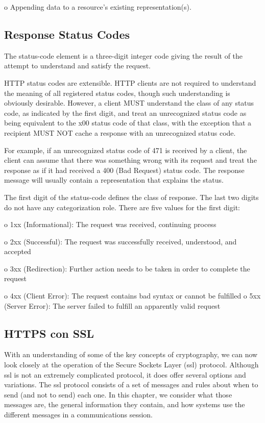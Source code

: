   o  Appending data to a resource's existing representation(s).


\subsection{Response Status Codes} 
The status-code element is a three-digit integer code giving the
   result of the attempt to understand and satisfy the request.

   HTTP status codes are extensible.  HTTP clients are not required to
   understand the meaning of all registered status codes, though such
   understanding is obviously desirable.  However, a client MUST
   understand the class of any status code, as indicated by the first
   digit, and treat an unrecognized status code as being equivalent to
   the x00 status code of that class, with the exception that a
   recipient MUST NOT cache a response with an unrecognized status code.

   For example, if an unrecognized status code of 471 is received by a
   client, the client can assume that there was something wrong with its
   request and treat the response as if it had received a 400 (Bad
   Request) status code.  The response message will usually contain a
   representation that explains the status.

   The first digit of the status-code defines the class of response.
   The last two digits do not have any categorization role.  There are
   five values for the first digit:

   o  1xx (Informational): The request was received, continuing process

   o  2xx (Successful): The request was successfully received,
      understood, and accepted

   o  3xx (Redirection): Further action needs to be taken in order to
      complete the request

   o  4xx (Client Error): The request contains bad syntax or cannot be
      fulfilled
      o  5xx (Server Error): The server failed to fulfill an apparently
      valid request
  

\subsection{HTTPS con SSL} 

With an understanding of some of the key concepts of cryptography,
we can now look closely at the operation of the Secure Sockets Layer
(ssl) protocol. Although ssl is not an extremely complicated protocol, 
it does offer several options and variations. 
The ssl protocol consists of a set of messages and rules about when
to send (and not to send) each one. In this chapter, we consider what
those messages are, the general information they contain, and how
systems use the different messages in a communications session. 

